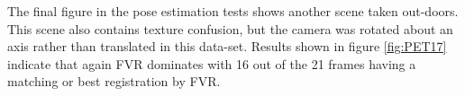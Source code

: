 The final figure in the pose estimation tests shows another scene taken out-doors. This scene also contains texture confusion, but the camera was rotated about an axis rather than translated in this data-set. Results shown in figure \ref{fig:PET17} indicate that again FVR dominates with 16 out of the 21 frames having a matching or best registration by FVR. 
